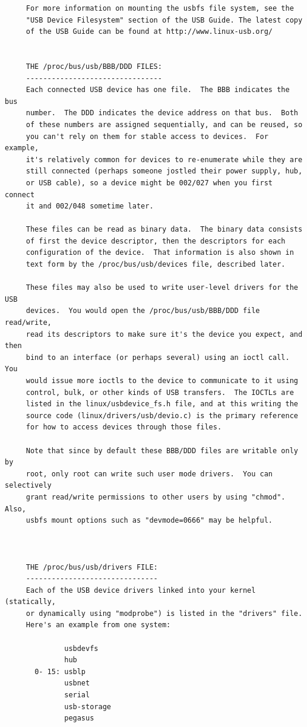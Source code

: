 {{{{{{{{{{{{{{{{{\begin{verbatim}
     For more information on mounting the usbfs file system, see the
     "USB Device Filesystem" section of the USB Guide. The latest copy
     of the USB Guide can be found at http://www.linux-usb.org/
     
     
     THE /proc/bus/usb/BBB/DDD FILES:
     --------------------------------
     Each connected USB device has one file.  The BBB indicates the bus
     number.  The DDD indicates the device address on that bus.  Both
     of these numbers are assigned sequentially, and can be reused, so
     you can't rely on them for stable access to devices.  For example,
     it's relatively common for devices to re-enumerate while they are
     still connected (perhaps someone jostled their power supply, hub,
     or USB cable), so a device might be 002/027 when you first connect
     it and 002/048 sometime later.
     
     These files can be read as binary data.  The binary data consists
     of first the device descriptor, then the descriptors for each
     configuration of the device.  That information is also shown in
     text form by the /proc/bus/usb/devices file, described later.
     
     These files may also be used to write user-level drivers for the USB
     devices.  You would open the /proc/bus/usb/BBB/DDD file read/write,
     read its descriptors to make sure it's the device you expect, and then
     bind to an interface (or perhaps several) using an ioctl call.  You
     would issue more ioctls to the device to communicate to it using
     control, bulk, or other kinds of USB transfers.  The IOCTLs are
     listed in the linux/usbdevice_fs.h file, and at this writing the
     source code (linux/drivers/usb/devio.c) is the primary reference
     for how to access devices through those files.
     
     Note that since by default these BBB/DDD files are writable only by
     root, only root can write such user mode drivers.  You can selectively
     grant read/write permissions to other users by using "chmod".  Also,
     usbfs mount options such as "devmode=0666" may be helpful.
     
     
     
     THE /proc/bus/usb/drivers FILE:
     -------------------------------
     Each of the USB device drivers linked into your kernel (statically,
     or dynamically using "modprobe") is listed in the "drivers" file.
     Here's an example from one system:
     
              usbdevfs
              hub
       0- 15: usblp
              usbnet
              serial
              usb-storage
              pegasus
     

\end{verbatim}}}}}}}}}}}}}}}}}}

